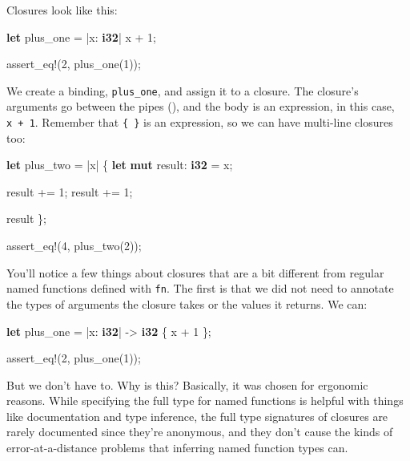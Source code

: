 \documentclass[a4paper,]{book}
\newenvironment{Shaded}{\begin{snugshade}}{\end{snugshade}}
\newcommand{\KeywordTok}[1]{\textcolor[rgb]{0.13,0.29,0.53}{\textbf{{#1}}}}
\newcommand{\DecValTok}[1]{\textcolor[rgb]{0.00,0.00,0.81}{{#1}}}
\newcommand{\OtherTok}[1]{\textcolor[rgb]{0.56,0.35,0.01}{{#1}}}
\newcommand{\NormalTok}[1]{{#1}}
\begin{document}
Closures look like this:

\begin{Shaded}
\begin{Highlighting}[]
\KeywordTok{let} \NormalTok{plus_one = |x: }\KeywordTok{i32}\NormalTok{| x + }\DecValTok{1}\NormalTok{;}

\OtherTok{assert_eq!}\NormalTok{(}\DecValTok{2}\NormalTok{, plus_one(}\DecValTok{1}\NormalTok{));}
\end{Highlighting}
\end{Shaded}

We create a binding, \texttt{plus\_one}, and assign it to a closure. The
closure's arguments go between the pipes (\texttt{\textbar{}}), and the
body is an expression, in this case, \texttt{x\ +\ 1}. Remember that
\texttt{\{\ \}} is an expression, so we can have multi-line closures
too:

\begin{Shaded}
\begin{Highlighting}[]
\KeywordTok{let} \NormalTok{plus_two = |x| \{}
    \KeywordTok{let} \KeywordTok{mut} \NormalTok{result: }\KeywordTok{i32} \NormalTok{= x;}

    \NormalTok{result += }\DecValTok{1}\NormalTok{;}
    \NormalTok{result += }\DecValTok{1}\NormalTok{;}

    \NormalTok{result}
\NormalTok{\};}

\OtherTok{assert_eq!}\NormalTok{(}\DecValTok{4}\NormalTok{, plus_two(}\DecValTok{2}\NormalTok{));}
\end{Highlighting}
\end{Shaded}

You'll notice a few things about closures that are a bit different from
regular named functions defined with \texttt{fn}. The first is that we
did not need to annotate the types of arguments the closure takes or the
values it returns. We can:

\begin{Shaded}
\begin{Highlighting}[]
\KeywordTok{let} \NormalTok{plus_one = |x: }\KeywordTok{i32}\NormalTok{| -> }\KeywordTok{i32} \NormalTok{\{ x + }\DecValTok{1} \NormalTok{\};}

\OtherTok{assert_eq!}\NormalTok{(}\DecValTok{2}\NormalTok{, plus_one(}\DecValTok{1}\NormalTok{));}
\end{Highlighting}
\end{Shaded}

But we don't have to. Why is this? Basically, it was chosen for
ergonomic reasons. While specifying the full type for named functions is
helpful with things like documentation and type inference, the full type
signatures of closures are rarely documented since they're anonymous,
and they don't cause the kinds of error-at-a-distance problems that
inferring named function types can.
\end{document}
